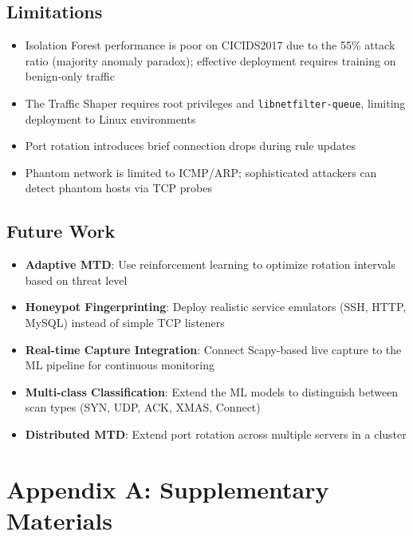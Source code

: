 \documentclass[12pt,a4paper]{report}
\begin{document}
\section{Limitations}

\begin{itemize}
    \item Isolation Forest performance is poor on CICIDS2017 due to the 55\% attack ratio (majority anomaly paradox); effective deployment requires training on benign-only traffic
    \item The Traffic Shaper requires root privileges and \texttt{libnetfilter-queue}, limiting deployment to Linux environments
    \item Port rotation introduces brief connection drops during rule updates
    \item Phantom network is limited to ICMP/ARP; sophisticated attackers can detect phantom hosts via TCP probes
\end{itemize}

\section{Future Work}

\begin{itemize}
    \item \textbf{Adaptive MTD}: Use reinforcement learning to optimize rotation intervals based on threat level
    \item \textbf{Honeypot Fingerprinting}: Deploy realistic service emulators (SSH, HTTP, MySQL) instead of simple TCP listeners
    \item \textbf{Real-time Capture Integration}: Connect Scapy-based live capture to the ML pipeline for continuous monitoring
    \item \textbf{Multi-class Classification}: Extend the ML models to distinguish between scan types (SYN, UDP, ACK, XMAS, Connect)
    \item \textbf{Distributed MTD}: Extend port rotation across multiple servers in a cluster
\end{itemize}

\appendix


\chapter{Appendix A: Supplementary Materials}\label{ch:appendix_a}
\end{document}
